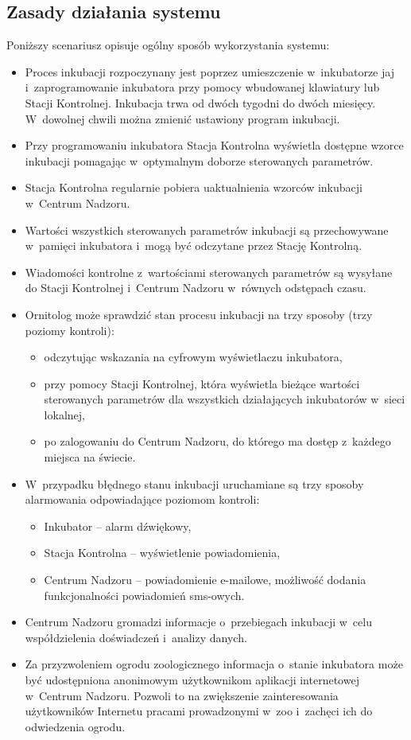 \subsection{Zasady działania systemu}
Poniższy scenariusz opisuje ogólny sposób wykorzystania systemu:
\begin{itemize}
	\item Proces inkubacji rozpoczynany jest poprzez umieszczenie w~inkubatorze
		jaj i~zaprogramowanie inkubatora przy pomocy wbudowanej klawiatury lub
		Stacji Kontrolnej. Inkubacja trwa od dwóch tygodni do dwóch miesięcy.
		W~dowolnej chwili można zmienić ustawiony program inkubacji.
	\item Przy programowaniu inkubatora Stacja Kontrolna wyświetla dostępne wzorce
		inkubacji pomagając w~optymalnym doborze sterowanych parametrów.
	\item Stacja Kontrolna regularnie pobiera uaktualnienia wzorców inkubacji
		w~Centrum Nadzoru.
	\item Wartości wszystkich sterowanych parametrów inkubacji są przechowywane
		w~pamięci inkubatora i~mogą być odczytane przez Stację Kontrolną.
	\item Wiadomości kontrolne z~wartościami sterowanych parametrów są wysyłane do
		Stacji Kontrolnej i~Centrum Nadzoru w~równych odstępach czasu.
	\item Ornitolog może sprawdzić stan procesu inkubacji na trzy sposoby (trzy
		poziomy kontroli):
		\begin{itemize}
			\item odczytując wskazania na cyfrowym wyświetlaczu inkubatora,
			\item przy pomocy Stacji Kontrolnej, która wyświetla bieżące wartości
				sterowanych parametrów dla wszystkich działających inkubatorów w~sieci
				lokalnej,
			\item po zalogowaniu do Centrum Nadzoru, do którego ma dostęp z~każdego
				miejsca na świecie.
		\end{itemize}
	\item W~przypadku błędnego stanu inkubacji uruchamiane są trzy sposoby
		alarmowania odpowiadające poziomom kontroli:
		\begin{itemize}
			\item Inkubator -- alarm dźwiękowy,
			\item Stacja Kontrolna -- wyświetlenie powiadomienia,
			\item Centrum Nadzoru -- powiadomienie e-mailowe, możliwość dodania
				funkcjonalności powiadomień sms-owych.
		\end{itemize}
	\item Centrum Nadzoru gromadzi informacje o~przebiegach inkubacji w~celu
		współdzielenia doświadczeń i~analizy danych.
	\item Za przyzwoleniem ogrodu zoologicznego informacja o~stanie inkubatora
		może być udostępniona anonimowym użytkownikom aplikacji internetowej
		w~Centrum Nadzoru. Pozwoli to na zwiększenie zainteresowania użytkowników
		Internetu pracami prowadzonymi w~zoo i~zachęci ich do odwiedzenia ogrodu.
\end{itemize}

